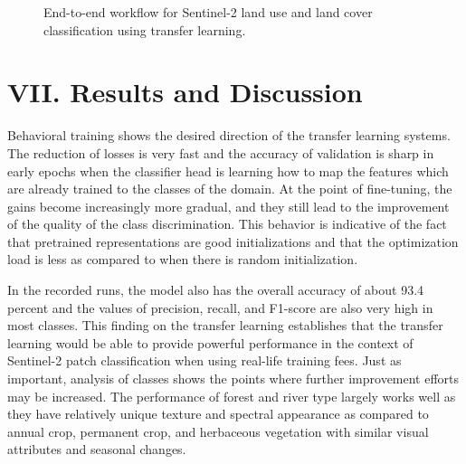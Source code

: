 ﻿\documentclass[conference]{IEEEtran}
\begin{document}
\begin{figure}[!t]
\centering
{}
\caption{End-to-end workflow for Sentinel-2 land use and land cover classification using transfer learning.}
\label{fig:workflow_tex}
\end{figure}

\section*{VII. Results and Discussion}

Behavioral training shows the desired direction of the transfer learning systems. The reduction of losses is very fast and the accuracy of validation is sharp in early epochs when the classifier head is learning how to map the features which are already trained to the classes of the domain. At the point of fine-tuning, the gains become increasingly more gradual, and they still lead to the improvement of the quality of the class discrimination. This behavior is indicative of the fact that pretrained representations are good initializations and that the optimization load is less as compared to when there is random initialization.

In the recorded runs, the model also has the overall accuracy of about 93.4 percent and the values of precision, recall, and F1-score are also very high in most classes. This finding on the transfer learning establishes that the transfer learning would be able to provide powerful performance in the context of Sentinel-2 patch classification when using real-life training fees. Just as important, analysis of classes shows the points where further improvement efforts may be increased. The performance of forest and river type largely works well as they have relatively unique texture and spectral appearance as compared to annual crop, permanent crop, and herbaceous vegetation with similar visual attributes and seasonal changes.
\end{document}
